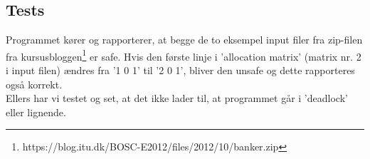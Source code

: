 \subsection{Tests}
\label{O4_Tests}
Programmet kører og rapporterer, at begge de to eksempel input filer fra zip-filen fra kursusbloggen\footnote{https://blog.itu.dk/BOSC-E2012/files/2012/10/banker.zip} er safe. Hvis den første linje i 'allocation matrix' (matrix nr. 2 i  input filen) ændres fra '1 0 1' til '2 0 1', bliver den unsafe og dette rapporteres også korrekt.
\\Ellers har vi testet og set, at det ikke lader til, at programmet går i 'deadlock' eller lignende.
